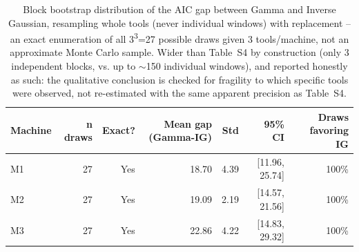 \begin{table}[t]
\centering
\caption{Block bootstrap distribution of the AIC gap between Gamma and Inverse Gaussian, resampling whole tools (never individual windows) with replacement -- an exact enumeration of all 3\textsuperscript{3}=27 possible draws given 3 tools/machine, not an approximate Monte Carlo sample. Wider than Table~S4 by construction (only 3 independent blocks, vs. up to $\sim$150 individual windows), and reported honestly as such: the qualitative conclusion is checked for fragility to which specific tools were observed, not re-estimated with the same apparent precision as Table~S4.}
\label{tab:block-bootstrap-aic-gap}
\begin{tabular}{lrrrrrr}
\toprule
Machine & n draws & Exact? & Mean gap (Gamma-IG) & Std & 95\% CI & Draws favoring IG \\
\midrule
M1 & 27 & Yes & 18.70 & 4.39 & [11.96, 25.74] & 100\% \\
M2 & 27 & Yes & 19.09 & 2.19 & [14.57, 21.56] & 100\% \\
M3 & 27 & Yes & 22.86 & 4.22 & [14.83, 29.32] & 100\% \\
\bottomrule
\end{tabular}
\end{table}
